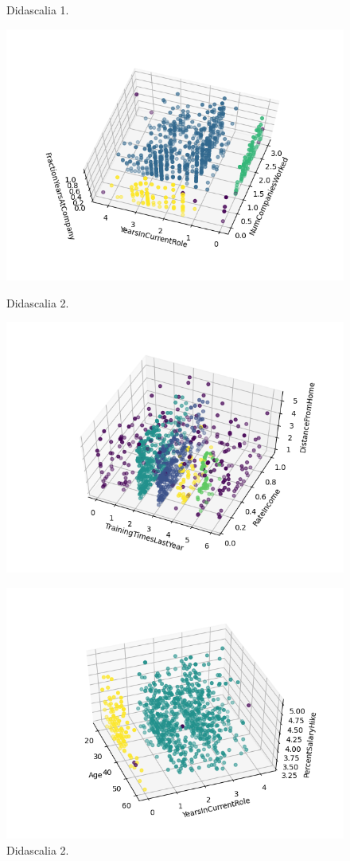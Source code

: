\documentclass[english]{article}
\begin{document}
\begin{figure}[H]
\begin{minipage}[b]{0.45\textwidth}
\caption{Didascalia 1.}
\label{etichetta1}
\end{minipage}
\hfill
\begin{minipage}[b]{0.45\textwidth}
\centering
\includegraphics[width=\textwidth]{./Figure/Cluster/dbscan/3/Figure_24.png}
\caption{Didascalia 2.}
\label{etichetta2}
\centering
\includegraphics[width=\textwidth]{./Figure/Cluster/dbscan/5/Figure_5.png}
\caption{Didascalia 2.}
\label{etichetta2}
\centering
\includegraphics[width=\textwidth]{./Figure/Cluster/dbscan/4/Figure_21.png}

\end{minipage}
\end{figure}
\end{document}
